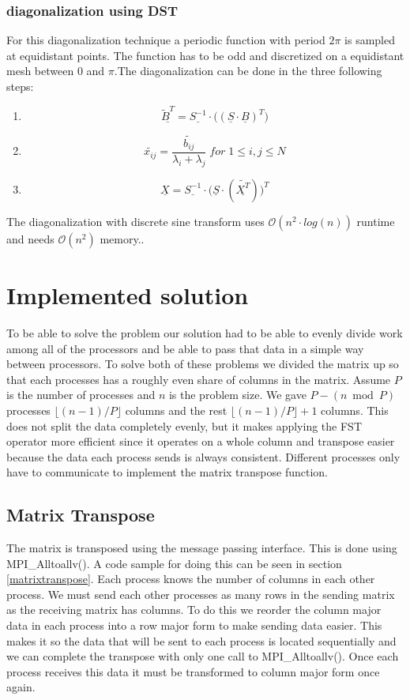\documentclass{article}
\begin{document}
\subsubsection{diagonalization using DST}
For this diagonalization technique a periodic function with period $2\pi$ is sampled at equidistant points. The function has to be odd and discretized on a equidistant mesh between 0 and $\pi$.The diagonalization can be done in the three following steps:
\begin{enumerate}
\item $$ \underline{\tilde{B}^T}=\underline{S^{-1}}\cdot\big((\underline{S}\cdot\underline{B})^T\big)$$
\item $$ \tilde{x_{ij}}=\frac{\tilde{b_{ij}}}{\lambda_i+\lambda_j}\;for\;1\leq i,j\leq N$$
\item $$ \underline{X}=\underline{S^{-1}}\cdot\big(\underline{S}\cdot(\underline{\tilde{X^T}})\big)^T$$
\end{enumerate}
The diagonalization with discrete sine transform uses $\mathcal{O}(n^2\cdot log(n))$ runtime and needs $\mathcal{O}(n^2)$ memory..

\section{Implemented solution}
	To be able to solve the problem our solution had to be able to evenly divide work among all of the processors and be able to pass that data in a simple way between processors. To solve both of these problems we divided the matrix up so that each processes has a roughly even share of columns in the matrix. Assume $P$ is the number of processes and $n$ is the problem size. We gave $P - (n \bmod P)$ processes $\lfloor (n-1)/P \rfloor$ columns and the rest $\lfloor (n-1)/P \rfloor + 1$ columns. This does not split the data completely evenly, but it makes applying the FST operator more efficient since it operates on a whole column and transpose easier because the data each process sends is always consistent. Different processes only have to communicate to implement the matrix transpose function.

\subsection{Matrix Transpose}
	The matrix is transposed using the message passing interface. This is done using MPI\_Alltoallv(). A code sample for doing this can be seen in section \ref{matrixtranspose}. Each process knows the number of columns in each other process. We must send each other processes as many rows in the sending matrix as the receiving matrix has columns. To do this we reorder the column major data in each process into a row major form to make sending data easier. This makes it so the data that will be sent to each process is located sequentially and we can complete the transpose with only one call to MPI\_Alltoallv(). Once each process receives this data it must be transformed to column major form once again.
\end{document}
